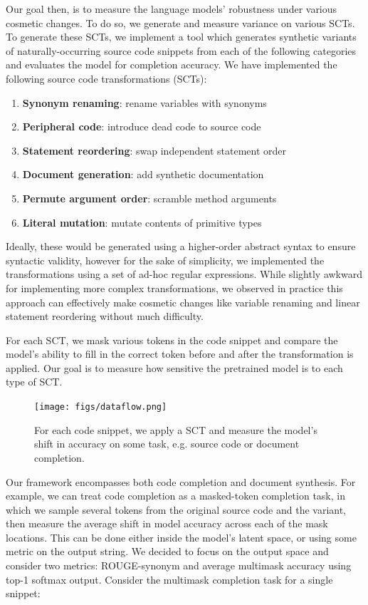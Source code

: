 \documentclass[sigconf,review,anonymous]{acmart}
\begin{document}
  Our goal then, is to measure the language models' robustness under various cosmetic changes. To do so, we generate and measure variance on various SCTs. To generate these SCTs, we implement a tool which generates synthetic variants of naturally-occurring source code snippets from each of the following categories and evaluates the model for completion accuracy. We have implemented the following source code transformations (SCTs):

  \begin{enumerate}
    \item \textbf{Synonym renaming}: rename variables with synonyms
    \item \textbf{Peripheral code}: introduce dead code to source code
    \item \textbf{Statement reordering}: swap independent statement order
    \item \textbf{Document generation}: add synthetic documentation
    \item \textbf{Permute argument order}: scramble method arguments
    \item \textbf{Literal mutation}: mutate contents of primitive types
  \end{enumerate}

  Ideally, these would be generated using a higher-order abstract syntax to ensure syntactic validity, however for the sake of simplicity, we implemented the transformations using a set of ad-hoc regular expressions. While slightly awkward for implementing more complex transformations, we observed in practice this approach can effectively make cosmetic changes like variable renaming and linear statement reordering without much difficulty.

  For each SCT, we mask various tokens in the code snippet and compare the model's ability to fill in the correct token before and after the transformation is applied. Our goal is to measure how sensitive the pretrained model is to each type of SCT.

  \begin{figure}[H]
    \centering
    \texttt{[image: figs/dataflow.png]}
    \caption{For each code snippet, we apply a SCT and measure the model's shift in accuracy on some task, e.g. source code or document completion.}
    \label{fig:dataflow}
  \end{figure}

  Our framework encompasses both code completion and document synthesis. For example, we can treat code completion as a masked-token completion task, in which we sample several tokens from the original source code and the variant, then measure the average shift in model accuracy across each of the mask locations. This can be done either inside the model's latent space, or using some metric on the output string. We decided to focus on the output space and consider two metrics: ROUGE-synonym and average multimask accuracy using top-1 softmax output. Consider the multimask completion task for a single snippet:
\end{document}
